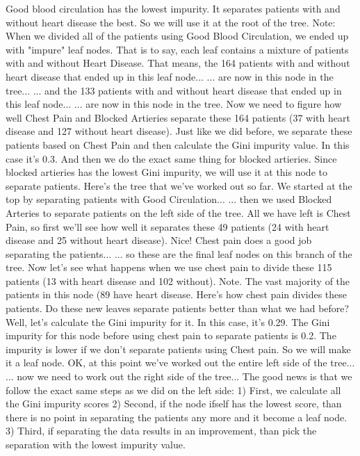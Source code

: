 \documentclass[
	final,
	a4paper,
	oneside,
	parskip=full,
	headings=standardclasses,
	headings=big,
	pointednumbers
]{scrartcl}
\begin{document}
        Good blood circulation has the lowest impurity. It separates patients
        with and without heart disease the best.
        So we will use it at the root of the tree.
        Note: When we divided all of the patients using Good Blood Circulation,
        we ended up with "impure" leaf nodes.
        That is to say, each leaf contains a mixture of patients with and without
        Heart Disease.
        That means, the 164 patients with and without heart disease that ended up
        in this leaf node...
        ... are now in this node in the tree...
        ... and the 133 patients with and without heart disease that ended
        up in this leaf node...
        ... are now in this node in the tree.
        Now we need to figure how well Chest Pain and Blocked Artieries separate
        these 164 patients (37 with heart disease and 127 without heart disease).
        Just like we did before, we separate these patients based on Chest Pain
        and then calculate the Gini impurity value. In this case it's 0.3.
        And then we do the exact same thing for blocked artieries.
        Since blocked artieries has the lowest Gini impurity, we will use it
        at this node to separate patients.
        Here's the tree that we've worked out so far.
        We started at the top by separating patients with Good Circulation...
        ... then we used Blocked Arteries to separate patients on the left side
        of the tree.
        All we have left is Chest Pain, so first we'll see how well it separates
        these 49 patients (24 with heart disease and 25 without heart disease).
        Nice! Chest pain does a good job separating the patients...
        ... so these are the final leaf nodes on this branch of the tree.
        Now let's see what happens when we use chest pain to divide these 115
        patients (13 with heart disease and 102 without).
        Note. The vast majority of the patients in this node (89%
        have heart disease.
        Here's how chest pain divides these patients.
        Do these new leaves separate patients better than what we had before?
        Well, let's calculate the Gini impurity for it. In this case, it's 0.29.
        The Gini impurity for this node before using chest pain to separate
        patients is 0.2.
        The impurity is lower if we don't separate patients using Chest pain.
        So we will make it a leaf node.
        OK, at this point we've worked out the entire left side of the tree...
        ... now we need to work out the right side of the tree...
        The good news is that we follow the exact same steps as we did on the
        left side:
        1) First, we calculate all the Gini impurity scores
        2) Second, if the node ifself has the lowest score, than
        there is no point in separating the patients any more and it become
        a leaf node.
        3) Third, if separating the data results in an improvement, than
        pick the separation with the lowest impurity value.
        
\end{document}
